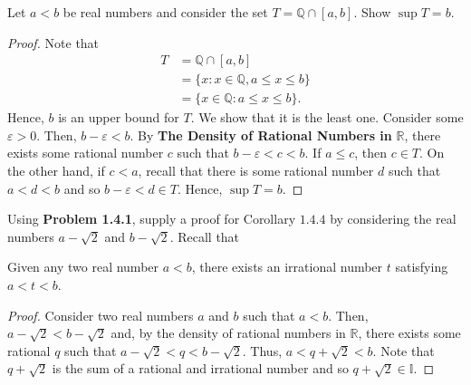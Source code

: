 \documentclass[12pt]{article}
\newcommand{\R}{\mathbb{R}}
\newcommand{\Q}{\mathbb{Q}}
\newenvironment{problem}[2][Problem]{\begin{trivlist}
		\item[\hskip \labelsep {\bfseries #1}\hskip \labelsep {\bfseries #2.}]}{\end{trivlist}}
\newenvironment{corollary}[2][Corollary]{\begin{trivlist}
		\item[\hskip \labelsep {\bfseries #1}\hskip \labelsep {\bfseries #2.}]}{\end{trivlist}}
\begin{document}
	\begin{problem}{1.4.4}
		Let $a<b$ be real numbers and consider the set $T=\Q\cap [a,b]$. Show $\sup T = b$.
		\begin{proof}
			Note that 
			\begin{align*}
				T &= \Q\cap [a,b]\\ 
				&= \{x : x\in \Q, a\leq x \leq b\}\\
				&= \{x\in \Q:a\leq x \leq b\}.
			\end{align*}
			Hence, $b$ is an upper bound for $T$. We show that it is the least one. Consider some $\varepsilon>0$. Then, $b-\varepsilon < b$. By \textbf{The Density of Rational Numbers in }$\R$, there exists some rational number $c$ such that $b-\varepsilon<c<b$. If $a\leq c$, then $c\in T$. On the other hand, if $c<a$, recall that there is some rational number $d$ such that $ a <d <b$ and so $b-\varepsilon < d \in T$. Hence, $\sup T = b$.
		\end{proof}
	\end{problem}
	
	\begin{problem}{1.4.5}
		Using \textbf{Problem 1.4.1}, supply a proof for Corollary $1.4.4$ by considering the real numbers $a-\sqrt{2}$ and $b-\sqrt{2}$. Recall that
		\begin{corollary}{1.4.4}
			Given any two real number $a<b$, there exists an irrational number $t$ satisfying $a<t<b$.
			\begin{proof}
				Consider two real numbers $a$ and $b$ such that $a<b$. Then, $a-\sqrt{2} < b-\sqrt{2}$ and, by the density of rational numbers in $\R$, there exists some rational $q$ such that $a-\sqrt{2} < q < b-\sqrt{2}$. Thus, $a < q + \sqrt{2} < b$. Note that $q+\sqrt{2}$ is the sum of a rational and irrational number and so $q+\sqrt{2}\in \mathbb{I}$.
			\end{proof}
		\end{corollary}
	\end{problem}
	
\end{document}
